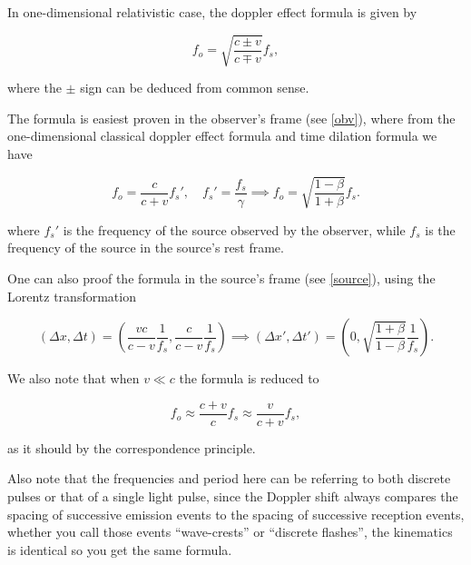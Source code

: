 \documentclass[english,a4paper,12pt]{report}
\begin{document}
In one-dimensional relativistic case, the doppler effect formula is given by 

\begin{equation}
    f_{o} = \sqrt{\frac{c\pm v}{c \mp v} } f_{s} ,  
\end{equation}

where the \(\pm \) sign can be deduced from common sense.

The formula is easiest proven in the observer's frame (see \cref{obv}), where from the one-dimensional classical doppler effect formula and time dilation formula we have 

\begin{equation}
    f_{o} = \frac{c}{c+v} f_{s}', \quad f_{s}' = \frac{f_{s} }{\gamma } \implies f_{o} = \sqrt{\frac{1-\beta }{1+\beta } } f_{s}.   
\end{equation}

where \(f_{s} '\) is the frequency of the source observed by the observer, while \(f_{s} \) is the frequency of the source in the source's rest frame. 

One can also proof the formula in the source's frame (see \cref{source}), using the Lorentz transformation 

\begin{equation}
    (\Delta x,\Delta t) = \left( \frac{vc}{c-v} \frac{1}{f_{s} }, \frac{c}{c-v} \frac{1}{f_{s} }     \right) \implies (\Delta x', \Delta t') = \left( 0, \sqrt{\frac{1+\beta }{1-\beta } } \frac{1}{f_{s} }  \right).
\end{equation}




We also note that when \(v \ll c\) the formula is reduced to 

\begin{equation}
    f_{o} \approx \frac{c+v}{c} f_{s} \approx \frac{v}{c+v} f_{s},     
\end{equation}

as it should by the correspondence principle.  

Also note that the frequencies and period here can be referring to both discrete pulses or that of a single light pulse, since the Doppler shift always compares the spacing of successive emission events to the spacing of successive reception events, whether you call those events ``wave-crests'' or ``discrete flashes'', the kinematics is identical so you get the same formula.
\end{document}
